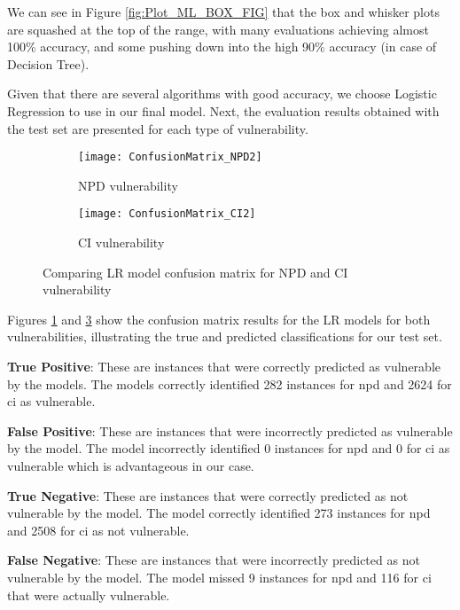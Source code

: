 We can see in Figure \ref{fig:Plot_ML_BOX_FIG} that the box and whisker plots are squashed at the top of the range, with many evaluations achieving almost 100\% accuracy, and some pushing down into the high 90\% accuracy (in case of Decision Tree).

Given that there are several algorithms with good accuracy, we choose Logistic Regression to use in our final model. Next, the evaluation results obtained with the test set are presented for each type of vulnerability.

\newpage

\begin{figure}
  \centering

  \begin{subfigure}{0.7\textwidth}
    \centering
    \texttt{[image: ConfusionMatrix\_NPD2]}
    \caption{NPD vulnerability}
    \label{fig:ConfusionMatrix_NPD_FIG}
  \end{subfigure}
  \hfill
  \begin{subfigure}{0.7\textwidth}
    \centering
    \texttt{[image: ConfusionMatrix\_CI2]}
    \caption{CI vulnerability}
    \label{fig:ConfusionMatrix_CI_FIG}
  \end{subfigure}

  \caption{Comparing LR model confusion matrix for NPD and CI vulnerability}
\end{figure}

Figures \ref{fig:ConfusionMatrix_NPD_FIG} and \ref{fig:ConfusionMatrix_CI_FIG} show the confusion matrix results for the LR models for both vulnerabilities, illustrating the true and predicted classifications for our test set.

\textbf{True Positive}: These are instances that were correctly predicted as vulnerable by the models. The models correctly identified 282 instances for \gls{npd} and 2624 for \gls{ci} as vulnerable.

\textbf{False Positive}: These are instances that were incorrectly predicted as vulnerable by the model. The model incorrectly identified 0 instances for \gls{npd} and 0 for \gls{ci} as vulnerable which is advantageous in our case.

\textbf{True Negative}: These are instances that were correctly predicted as not vulnerable by the model. The model correctly identified 273 instances for \gls{npd} and 2508 for \gls{ci} as not vulnerable.

\textbf{False Negative}: These are instances that were incorrectly predicted as not vulnerable by the model. The model missed 9 instances for \gls{npd} and 116 for \gls{ci} that were actually vulnerable.

